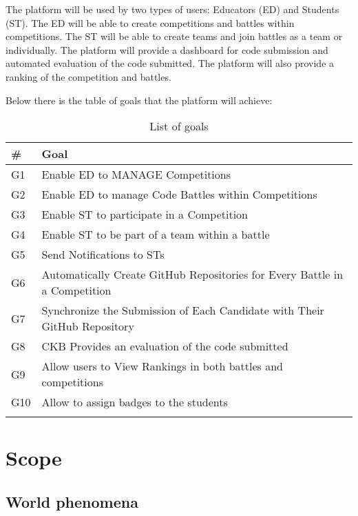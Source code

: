 The platform will be used by two types of users: Educators (ED) and Students (ST). The ED will be able to create competitions and battles within competitions. The ST will be able to create teams and join battles as a team or individually. The platform will provide a dashboard for code submission and automated evaluation of the code submitted. The platform will also provide a ranking of the competition and battles.

Below there is the table of goals that the platform will achieve:
\begin{longtable}{|l|l|}
  \hline
  \textbf{\#} & \textbf{Goal}      \\
  \hline
  G1 & Enable ED to MANAGE Competitions \\
  \hline
  G2 & Enable ED to manage Code Battles within Competitions \\
  \hline
  G3 & Enable ST to participate in a Competition \\
  \hline
  G4 & Enable ST to be part of a team within a battle \\
  \hline
  G5 & Send Notifications to STs   \\
  \hline
  G6 & Automatically Create GitHub Repositories for Every Battle in a Competition    \\
  \hline
  G7 & Synchronize the Submission of Each Candidate with Their GitHub Repository   \\
  \hline
  G8 & CKB Provides an evaluation of the code submitted    \\
  \hline
  G9 & Allow users to View Rankings in both battles and competitions   \\
  \hline
  G10 & Allow to assign badges to the students    \\
  \hline
  \caption{List of goals}
  \label{tab:goals}
\end{longtable}

\pagebreak
\section{Scope}
\label{s:Scope}%

\subsection{World phenomena}
\label{ss:world_phenomena}%

